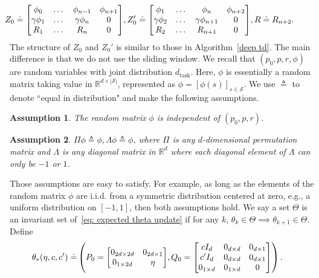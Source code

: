 \documentclass{article}
\newcommand{\fS}{\mathcal{S}}
\newcommand{\R}{\mathbb{R}}
\newcommand{\ns}{{|\fS|}}
\newtheorem{assumption}{Assumption}[section]
\begin{document}
\begin{align}
\label{eq: prompt for invariant set markovian}
\!\!\!\!\!\!\!\!\!\!\!\!\!\!\!\!\!\! Z_0 \doteq \mqty[\phi_0 & \dots & \phi_{n-1} & \phi_{n+1} \\
                     \gamma \phi_1 & \dots & \gamma \phi_{n} & 0 \\
                     R_1 & \dots & R_n & 0],
    Z_0' \doteq \mqty[\phi_1 & \dots & \phi_{n} & \phi_{n+2} \\
                      \gamma \phi_2 & \dots & \gamma \phi_{n+1} & 0 \\
                      R_2 & \dots & R_{n+1} & 0],
    R \doteq R_{n+2}.
\end{align}
The structure of $Z_0$ and $Z_0'$ is similar to those in Algorithm~\ref{deep td}. The main difference is that we do not use the sliding window.
We recall that $(p_0, p, r, \phi)$ are random variables with joint distribution $d_\text{task}$. Here, $\phi$ is essentially a random matrix taking value in $\R^{d \times \ns}$, represented as $\phi = [\phi(s)]_{s \in \fS}$.
We use $\triangleq$ to denote ``equal in distribution" and make the following assumptions.
\begin{assumption}
    \label{assumption independence}
    The random matrix $\phi$ is independent of $(p_0, p, r)$.
\end{assumption}
\begin{assumption}
    \label{assumption symmetry}
    $\Pi \phi \triangleq \phi, \Lambda \phi \triangleq \phi$,
    where $\Pi$ is any $d$-dimensional permutation matrix and $\Lambda$ is any diagonal matrix in $\R^d$ where each diagonal element of $\Lambda$ can only be $-1$ or $1$.
\end{assumption}
Those assumptions are easy to satisfy.
For example,
as long as the elements of the random matrix $\phi$ are i.i.d. from a symmetric distribution centered at zero, e.g., a uniform distribution on $[-1, 1]$,
then both assumptions hold.
We say a set $\Theta$ is an invariant set of~\eqref{eq: expected theta update} if for any $k$, $\theta_k \in \Theta \implies \theta_{k+1} \in \Theta$.
Define
\begin{align}
            \theta_*(\eta, c, c') \doteq&  \textstyle \left(P_0 = \mqty[0_{2d \times 2d} & 0_{2d \times 1} \\ 0_{1 \times 2d} & \eta], Q_0 =  \mqty[c I_d & 0_{d \times d} & 0_{d \times 1} \\ c' I_d  & 0_{d \times d} & 0_{d \times 1} \\ 0_{1 \times d} & 0_{1 \times d} & 0] \right)  \label{eq: optimal single layer}.
         \end{align}
\end{document}
